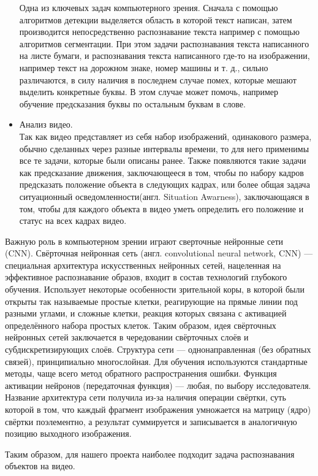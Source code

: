 \begin{itemize}
            Одна из ключевых задач компьютерного зрения. Сначала с помощью алгоритмов детекции выделяется область в которой текст написан, затем производится непосредственно распознавание текста например с помощью алгоритмов сегментации. При этом задачи распознавания текста написанного на листе бумаги, и распознавания текста написанного где-то на изображении, например текст на дорожном знаке, номер машины и т. д., сильно различаются, в силу наличия в последнем случае помех, которые мешают выделить конкретные буквы. В этом случае может помочь, например обучение предсказания буквы по остальным буквам в слове.
        \item Анализ видео. \\
            Так как видео представляет из себя набор изображений, одинакового размера, обычно сделанных через разные интервалы времени, то для него применимы все те задачи, которые были описаны ранее. Также появляются такие задачи как предсказание движения, заключающееся в том, чтобы по набору кадров предсказать положение объекта в следующих кадрах, или более общая задача ситуационный осведомленности(англ. Situation Awarness), заключающаяся в том, чтобы для каждого объекта в видео уметь определить его положение и статус на всех кадрах видео.
    \end{itemize}

    Важную роль в компьютерном зрении играют сверточные нейронные сети (CNN). Свёрточная нейронная сеть (англ. convolutional neural network, CNN) — специальная архитектура искусственных нейронных сетей, нацеленная на эффективное распознавание образов, входит в состав технологий глубокого обучения. Использует некоторые особенности зрительной коры, в которой были открыты так называемые простые клетки, реагирующие на прямые линии под разными углами, и сложные клетки, реакция которых связана с активацией определённого набора простых клеток. Таким образом, идея свёрточных нейронных сетей заключается в чередовании свёрточных слоёв и субдискретизирующих слоёв. Структура сети — однонаправленная (без обратных связей), принципиально многослойная. Для обучения используются стандартные методы, чаще всего метод обратного распространения ошибки. Функция активации нейронов (передаточная функция) — любая, по выбору исследователя. Название архитектура сети получила из-за наличия операции свёртки, суть которой в том, что каждый фрагмент изображения умножается на матрицу (ядро) свёртки поэлементно, а результат суммируется и записывается в аналогичную позицию выходного изображения.

    Таким образом, для нашего проекта наиболее подходит задача распознавания объектов на видео.

